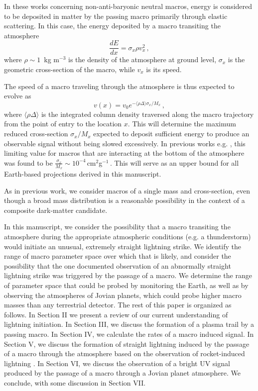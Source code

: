 \documentclass[%
reprint,
 amsmath,amssymb,
 aps,
 prd,
]{revtex4-2}
\begin{document}
    In these works concerning non-anti-baryonic neutral macros,  energy is considered to be  deposited in matter by the passing macro  primarily through elastic scattering. In this case, the energy deposited by a macro transiting the atmosphere 
    \begin{equation}\label{eq:dedx}
        \frac{dE}{dx} = \sigma_x \rho v_x^2\,,
    \end{equation}
    where $\rho \sim 1\,$ kg m$^{-3}$ is the density of the atmosphere at ground level, $\sigma_x$ is the geometric cross-section of the macro,  while $v_x$ is its speed.
    
    The speed of a macro traveling through the atmosphere is thus expected to evolve as
    \begin{equation}\label{eq:atmo_velocity}
        v(x) = v_{0} e^{-\langle \rho \Delta\rangle \sigma_x/{M_x}}\,,
    \end{equation}
    where $\langle \rho \Delta\rangle$ is the integrated column density traversed along the macro trajectory from the point of entry to the location $x$. This will determine the maximum reduced cross-section $\sigma_x/M_x$ expected to deposit sufficient energy to produce an observable signal without being slowed excessively. In previous works e.g. \cite{Sidhu2019death, Sidhu2019bolide}, this limiting value for macros that are interacting at the bottom of the atmosphere was found to be $\frac{\sigma_x}{M_x} \sim 10^{-4}\,$cm$^2$g$^{-1}\,$. This will serve as an upper bound for all Earth-based projections derived in this manuscript.

    As in previous work, we consider macros of a single mass and cross-section, even though a broad mass distribution is a reasonable possibility in the context of a composite dark-matter candidate.

    In this manuscript, we consider the possibility that a macro transiting the atmosphere during the appropriate atmospheric conditions (e.g. a thunderstorm) would initiate an unusual, extremely straight lightning strike. We identify the range of macro parameter space over which that is likely, and consider the possibility that the one documented observation of an abnormally straight lightning strike was triggered by the passage of a macro.  We determine the range of parameter space that could be probed by monitoring the Earth, as well as by observing the atmospheres of Jovian planets, which could probe higher macro masses than any terrestrial detector. The rest of this paper is organized as follows. In Section II we present a review of our current understanding of lightning initiation. In Section III, we discuss the formation of a plasma trail by a passing macro. In Section IV, we calculate the rates of a macro induced signal. In Section V, we discuss the formation of straight lightning induced by the passage of a macro through the atmosphere based on the observation of rocket-induced lightning \cite{Wang1999, rocket2012, Hill2012, Hill2013}. In Section VI, we discuss the observation of a bright UV signal produced by the passage of a macro through a Jovian planet atmosphere. We conclude, with some discussion in Section VII.
    
\end{document}
